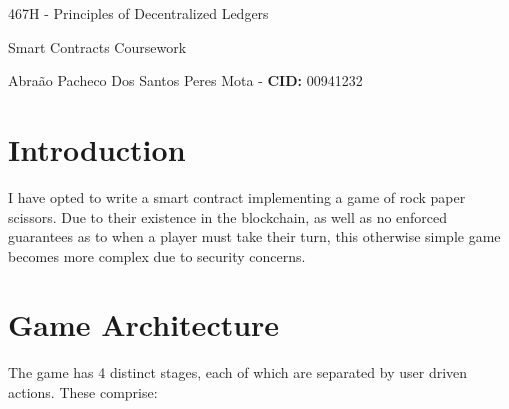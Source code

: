 \documentclass[a4paper, twoside]{article}
\title{}
\author{Abra\~{a}o Pacheco Dos Santos Peres Mota}
\begin{document}
	
	\begin{center}
	\Large{467H - Principles of Decentralized Ledgers
		
		Smart Contracts Coursework} 
	
	\Large{Abra\~{a}o Pacheco Dos Santos Peres Mota - }
	\large{\textbf{CID:} 00941232}
	\end{center}

\section{Introduction}

I have opted to write a smart contract implementing a game of rock paper scissors. Due to their existence in the blockchain, as well as no enforced guarantees as to when a player must take their turn, this otherwise simple game becomes more complex due to security concerns.

\section{Game Architecture}

The game has 4 distinct stages, each of which are separated by user driven actions. These comprise:
\end{document}
